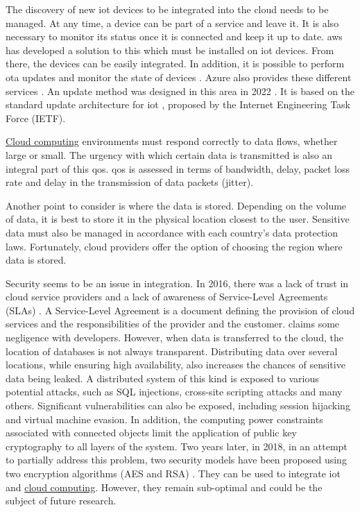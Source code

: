 The discovery of new \acrshort{iot} devices to be integrated into the \gls{cloud} needs to be managed. At any time, a device can be part of a service and leave it. It is also necessary to monitor its status once it is connected and keep it up to date. \gls{aws} has developed a solution to this which must be installed on \acrshort{iot} devices. From there, the devices can be easily integrated. In addition, it is possible to perform \acrfull{ota} updates \cite{ota_aws_iot} and monitor the state of devices \cite{status_aws_iot}. Azure also provides these different services \cite{ota_azure_iot, status_azure_iot}. An update method was designed in this area in 2022 \cite{OTA_Solution_proposed}. It is based on the standard update architecture for \acrshort{iot} \cite{firmware_update_architecture_iot}, proposed by the Internet Engineering Task Force (IETF).

\hyperref[subsec:cloudcomputing]{Cloud computing} environments must respond correctly to data flows, whether large or small. The urgency with which certain data is transmitted is also an integral part of this \acrshort{qos}. \acrshort{qos} is assessed in terms of bandwidth, delay, packet loss rate and delay in the transmission of data packets (jitter). \cite{cloud_of_thing}

Another point to consider is where the data is stored. Depending on the volume of data, it is best to store it in the physical location closest to the user. Sensitive data must also be managed in accordance with each country's data protection laws. Fortunately, \gls{cloud} providers offer the option of choosing the region where data is stored. \cite{cloud_of_thing}

Security seems to be an issue in integration. In 2016, there was a lack of trust in \gls{cloud} service providers and a lack of awareness of Service-Level Agreements (SLAs) \cite{survey_integration_iot_cloud_computing}. A Service-Level Agreement is a document defining the provision of \gls{cloud} services and the responsibilities of the provider and the customer.  claims some negligence with developers. However, when data is transferred to the \gls{cloud}, the location of databases is not always transparent. Distributing data over several locations, while ensuring high availability, also increases the chances of sensitive data being leaked. A distributed system of this kind is exposed to various potential attacks, such as SQL injections, cross-site scripting attacks and many others. Significant vulnerabilities can also be exposed, including session hijacking and virtual machine evasion. In addition, the computing power constraints associated with connected objects limit the application of public key cryptography to all layers of the system. Two years later, in 2018, in an attempt to partially address this problem, two security models have been proposed using two encryption algorithms (AES and RSA) \cite{secure_integration_iot_cloud_computing}. They can be used to integrate \acrshort{iot} and \hyperref[subsec:cloudcomputing]{cloud computing}. However, they remain sub-optimal and could be the subject of future research.

